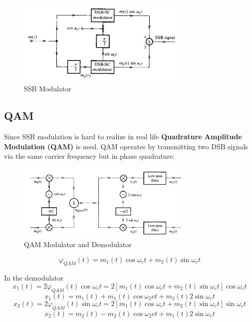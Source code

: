 \documentclass{article}
\begin{document}
    \begin{figure}[h]
        \centering
        \includegraphics[width=0.75\textwidth]{ssbmod}
        \caption{SSB Modulator}
    \end{figure}

    \subsection{QAM}
    Since SSB modulation is hard to realize in real life \textbf{Quadrature Amplitude Modulation (QAM)} is used. QAM operates by transmitting two DSB signals 
    via the same carrier frequency but in phase quadrature. 

    \begin{figure}[h]
        \centering
        \includegraphics[width=0.75\textwidth]{qam_mod_demod}
        \caption{QAM Modulator and Demodulator}
    \end{figure}

    \begin{equation}
        \varphi_{QAM} (t) = m_1(t)\cos\omega_c t + m_2(t)\sin\omega_ct
    \end{equation}

    In the demodulator
    \begin{equation}
        x_1(t) = 2\varphi_{QAM}(t)\cos\omega_ct = 2[m_1(t)\cos\omega_ct + m_2(t)\sin\omega_ct]\cos\omega_ct
    \end{equation}
    \begin{equation}
        x_1(t) = m_1(t) + m_1(t)\cos\omega_2ct +m_2(t)2\sin\omega_ct
    \end{equation}
    \begin{equation}
        x_2(t) = 2\varphi_{QAM}(t)\sin\omega_ct = 2[m_1(t)\cos\omega_ct + m_2(t)\sin\omega_ct]\sin\omega_ct
    \end{equation}
    \begin{equation}
        x_2(t) = m_2(t) - m_2(t)\cos\omega_2ct +m_1(t)2\sin\omega_ct
    \end{equation}
\end{document}

